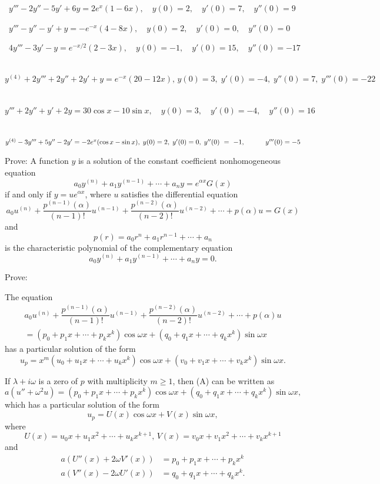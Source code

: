 \begin{exerciselist}
\item\label{exer:9.3.69}\CGex\  $y'''-2y''-5y'+6y=2e^x(1-6x),\quad
y(0)=2,
\quad y'(0)=7,\quad y''(0)=9$
\item\label{exer:9.3.70}\CGex\  $y'''-y''-y'+y=-e^{-x}(4-8x),\quad
y(0)=2,
\quad y'(0)=0,\quad y''(0)=0$
\item\label{exer:9.3.71}\CGex\  $4y'''-3y'-y=e^{-x/2}(2-3x),\quad
y(0)=-1,
\quad y'(0)=15,\quad y''(0)=-17$
\item\label{exer:9.3.72}\CGex\
$y^{(4)}+2y'''+2y''+2y'+y=e^{-x}(20-12x),\,
y(0)=3,\; y'(0)=-4,\; y''(0)=7,\; y'''(0)=-22$
\item\label{exer:9.3.73}\CGex\ $y'''+2y''+y'+2y=30\cos x-10\sin x,
\quad y(0)=3,\quad y'(0)=-4,\quad y''(0)=16$
\item\label{exer:9.3.74}\CGex\ $y^{(4)}-3y'''+5y''-2y'=-2e^x(\cos x-\sin
x),\; y(0)=2,\; y'(0)=0,\; y''(0)~=~-1, \\ \hspace*{30pt} y'''(0)=-5$

\item\label{exer:9.3.75}Prove:
A function $y$ is a solution of the constant coefficient
nonhomogeneous equation
\[
a_0y^{(n)}+a_1y^{(n-1)}+\cdots+a_ny=e^{\alpha x}G(x)
\tag{A}
\]
if and only if $y=ue^{\alpha x}$, where $u$ satisfies the differential
equation
\[
a_0u^{(n)}+\frac{p^{(n-1)}(\alpha)}{(n-1)!}u^{(n-1)}+
\frac{p^{(n-2)}(\alpha)}{(n-2)!}u^{(n-2)}+\cdots+p(\alpha)u=G(x)
\tag{B}
\]
and
\[
p(r)=a_0r^n+a_1r^{n-1} + \cdots + a_n
\]
is the characteristic polynomial of the complementary equation
\[
a_0y^{(n)}+a_1y^{(n-1)}+\cdots+a_ny=0.
\]

\item\label{exer:9.3.76}Prove:
\begin{alist}
\item %
The equation
\[
\begin{multlined}
a_0u^{(n)}+\dfrac{p^{(n-1)}(\alpha)}{(n-1)!}u^{(n-1)}+
\dfrac{p^{(n-2)}(\alpha)}{(n-2)!}u^{(n-2)}+\cdots+p(\alpha)u\\
=\left(p_0+p_1x+\cdots+p_kx^k\right)\cos\omega x
+ \left(q_0+q_1x+\cdots+q_kx^k\right)\sin\omega x
\end{multlined}
\tag{A}
\]
has a particular solution of the form
\[
u_p=x^m\left(u_0+u_1x+\cdots+u_kx^k\right)\cos\omega x+
\left(v_0+v_1x+\cdots+v_kx^k\right)\sin\omega x.
\]
\item %
If $\lambda+i\omega$ is a zero of $p$ with multiplicity $m\ge1$, then
(A) can be written as
\[
a(u''+\omega^2 u)=
\left(p_0+p_1x+\cdots+p_kx^k\right)\cos\omega x+
\left(q_0+q_1x+\cdots+q_kx^k\right)\sin\omega x,
\]
which has a particular solution of the form
\[
u_p=U(x)\cos\omega x+V(x)\sin\omega x,
\]
where
\[
U(x)=u_0x+u_1x^2+\cdots+u_kx^{k+1},\,V(x)=v_0x+v_1x^2+\cdots+v_kx^{k+1}
\]
and
\begin{align*}
a(U''(x)+2\omega V'(x))&=p_0+p_1x+\cdots+p_kx^k\\
a(V''(x)-2\omega U'(x))&=q_0+q_1x+\cdots+q_kx^k.
\end{align*}
\end{alist}

\end{exerciselist}


